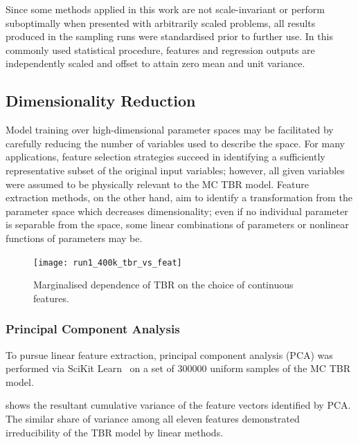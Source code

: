 Since some methods applied in this work are not scale-invariant or
perform suboptimally when presented with arbitrarily scaled problems, all results
produced in the sampling runs were standardised prior to further use. In this
commonly used statistical procedure, features and regression outputs are
independently scaled and offset to attain zero mean and unit variance.



\subsection{Dimensionality Reduction}
\label{sec:dimred}


Model training over high-dimensional parameter spaces may be facilitated by carefully reducing the number of variables used to describe the space. For many applications, feature selection strategies succeed in identifying a sufficiently representative subset of the original input variables; however, all given variables were assumed to be physically relevant to the MC TBR model. Feature extraction methods, on the other hand, aim to identify a transformation from the parameter space which decreases dimensionality; even if no individual parameter is separable from the space, some linear combinations of parameters or nonlinear functions of parameters may be.

\begin{figure}[h]
	\centering
	\texttt{[image: run1\_400k\_tbr\_vs\_feat]}
	\caption{Marginalised dependence of TBR on the choice of continuous
	features.}
  \label{fig:tbr-vs-features}
\end{figure}

\subsubsection{Principal Component Analysis}

To pursue linear feature extraction, principal component analysis (PCA)
\cite{Jolliffe2016} was performed via SciKit Learn~\cite{scikit-learn} on a set
of \num{300000} uniform samples of the MC TBR model. %

 shows the resultant cumulative variance of the feature vectors identified by PCA. The similar share of variance among all eleven features demonstrated irreducibility of the TBR model by linear methods.

